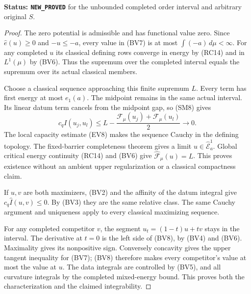 \noindent\textbf{Status: \texttt{NEW\_PROVED}}
for the unbounded completed order interval and
arbitrary original $S$.

\begin{proof}
The zero potential is admissible and has functional
value zero.  Since $\widehat e(u)\geq0$ and
$-u\leq-a$, every value in (BV7) is at most
$\int(-a)\,d\mu<\infty$.
For any completed $u$ its classical defining
rows converge in energy by (RC14) and in
$L^1(\mu)$ by (BV6).
Thus the supremum over the completed interval
equals the supremum over its actual classical
members.

Choose a classical sequence approaching this
finite supremum $L$.
Every term has first energy at most $e_1(a)$.
The midpoint remains in the same actual interval.
Its linear datum term cancels from the midpoint
gap, so (SM8) gives
\[
 c_q I(u_j,u_l)
       \leq L-\frac{\mathcal F_\mu(u_j)+
                              \mathcal F_\mu(u_l)}2\longrightarrow0.
 \tag{BV9}
\]
The local capacity estimate (EV8) makes the
sequence Cauchy in the defining topology.
The fixed-barrier completeness theorem gives
a limit $u\in\widehat{\mathcal E}^1_a$.
Global critical energy continuity (RC14) and
(BV6) give
$\widehat{\mathcal F}_\mu(u)=L$.
This proves existence without an ambient upper
regularization or a classical compactness claim.

If $u,v$ are both maximizers, (BV2) and the
affinity of the datum integral give
$c_q\widehat I(u,v)\leq0$.
By (BV3) they are the same relative class.
The same Cauchy argument and uniqueness apply
to every classical maximizing sequence.

For any completed competitor $v$, the segment
$u_t=(1-t)u+tv$ stays in the interval.
The derivative at $t=0$ is the left side of
(BV8), by (BV4) and (BV6).
Maximality gives its nonpositive sign.
Conversely concavity gives the upper tangent
inequality for (BV7); (BV8) therefore makes
every competitor's value at most the value
at $u$.  The data integrals are controlled
by (BV5), and all curvature integrals by
the completed mixed-energy bound.
This proves both the characterization and
the claimed integrability.
\end{proof}

